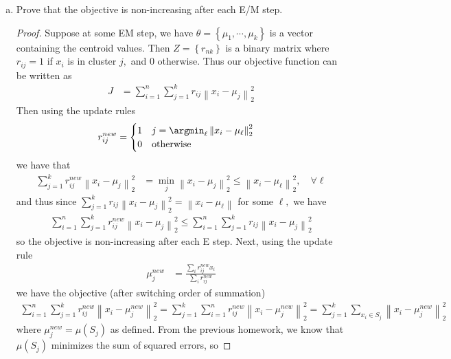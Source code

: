 \documentclass{article}
\begin{document}
\begin{enumerate}[(a)]
	\item Prove that the objective is non-increasing after each E/M step.
		\begin{proof}
			Suppose at some EM step, we have $\theta=\left\{ \mu_1, \cdots, \mu_k \right\}$ is a vector containing the centroid values. Then $Z=\left\{ r_{nk} \right\}$ is a binary matrix where $r_{ij}=1$ if $x_i$ is in cluster $j,$ and 0 otherwise. Thus our objective function can be written as
			\begin{align*}
				J &= \sum_{i=1}^{n} \sum_{j=1}^{k} r_{ij} \left\lVert x_i-\mu_j \right\rVert_2^2
			\end{align*}
			Then using the update rules
			\begin{align*}
				r_{ij}^{new} &= \begin{cases}
					1 & j=\argmin_{\ell} \left\lVert x_i-\mu_\ell \right\rVert_2^2 \\
					0 & \text{otherwise}
				\end{cases}
			\end{align*}
			we have that
			\begin{align*}
				\sum_{j=1}^{k} r_{ij}^{new} \left\lVert x_i-\mu_j \right\rVert_2^2 &= \min_j \left\lVert x_i-\mu_j \right\rVert_2^2 \le \left\lVert x_i-\mu_\ell \right\rVert_2^2, \quad \forall \ell
			\end{align*}
			and thus since $\sum_{j=1}^{k} r_{ij}\left\lVert x_i-\mu_j \right\rVert_2^2 = \left\lVert x_i-\mu_\ell \right\rVert$ for some $\ell,$ we have
			\begin{align*}
				\sum_{i=1}^{n} \sum_{j=1}^{k} r_{ij}^{new}\left\lVert x_i-\mu_j \right\rVert_2^2\le \sum_{i=1}^{n} \sum_{j=1}^{k} r_{ij}\left\lVert x_i-\mu_j \right\rVert_2^2
			\end{align*}
			so the objective is non-increasing after each E step. Next, using the update rule
			\begin{align*}
				\mu_j^{new} &= \frac{\sum_{i}^{}r_{ij}^{new} x_i}{\sum_{i}^{}r_{ij}^{new}}
			\end{align*}
			we have the objective (after switching order of summation)
			\begin{align*}
				\sum_{i=1}^{n} \sum_{j=1}^{k} r_{ij}^{new} \left\lVert x_i-\mu_j^{new} \right\rVert_2^2 = \sum_{j=1}^{k} \sum_{i=1}^{n} r_{ij}^{new} \left\lVert x_i-\mu_j^{new} \right\rVert_2^2 = \sum_{j=1}^{k} \sum_{ x_i\in S_j} \left\lVert x_i-\mu_j^{new} \right\rVert_2^2
			\end{align*}
			where $\mu_j^{new}=\mu(S_j)$ as defined. From the previous homework, we know that $\mu(S_j)$ minimizes the sum of squared errors, so

\end{proof}
\end{enumerate}
\end{document}
